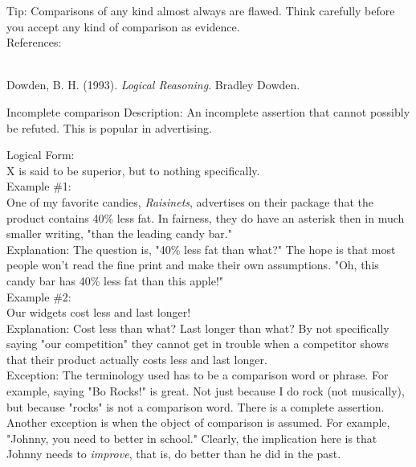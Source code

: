\documentclass[a4paper,12pt,single,pdftex]{scrartcl}
\begin{document}
    
      Tip: Comparisons of any kind almost always are flawed.  Think carefully before you accept any kind of comparison as evidence.
    \\

    References:

    
      
        
      \\

      
        
          Dowden, B. H. (1993). {\it Logical Reasoning}. Bradley Dowden.
        
      
    
  

Incomplete comparison
    Description: An incomplete assertion that cannot possibly be refuted. This is popular in advertising.

    
      Logical Form:
    \\

    
      X is said to be superior, but to nothing specifically.
    \\

    
      Example \#1:
    \\

    
      One of my favorite candies, {\it Raisinets}, advertises on their package that the product contains 40\% less fat. In fairness, they do have an asterisk then in much smaller writing, "than the leading candy bar."
    \\

    
      Explanation: The question is, "40\% less fat than what?" The hope is that most people won't read the fine print and make their own assumptions. "Oh, this candy bar has 40\% less fat than this apple!"
    \\

    
      Example \#2:
    \\

    
      Our widgets cost less and last longer!
    \\

    
      Explanation: Cost less than what? Last longer than what? By not specifically saying "our competition" they cannot get in trouble when a competitor shows that their product actually costs less and last longer.
    \\

    
      Exception: The terminology used has to be a comparison word or phrase. For example, saying "Bo Rocks!" is great. Not just because I do rock (not musically), but because "rocks" is not a comparison word. There is a complete assertion. Another exception is when the object of comparison is assumed. For example, "Johnny, you need to better in school." Clearly, the implication here is that Johnny needs to {\it improve}, that is, do better than he did in the past.
    \\
\end{document}
